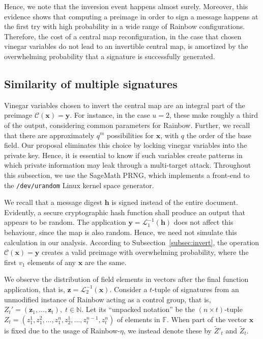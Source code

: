 \documentclass[12pt, a4paper, oneside]{memoir}
\theoremstyle{definition}
\begin{document}
Hence, we note that the inversion event happens almost surely. Moreover, this evidence shows that computing a preimage in order to sign a message happens at the first try with high probability in a wide range of Rainbow configurations. Therefore, the cost of a central map reconfiguration, in the case that chosen vinegar variables do not lead to an invertible central map, is amortized by the overwhelming probability that a signature is successfully generated.

\subsection{Similarity of multiple signatures}\label{subsec:similar}

Vinegar variables chosen to invert the central map are an integral part of the
preimage $\mathcal{C}(\mathbf{x}) = \mathbf{y}$. For instance, in the case $u = 2$, these make roughly a third of the output, considering common parameters for Rainbow. Further, we recall that there are approximately $q^{m}$ possibilities for $\mathbf{x}$, with $q$ the order of the base field. Our proposal eliminates this choice by locking vinegar variables into the private key. Hence, it is essential to know if such variables create patterns in which private information may leak through a multi-target attack. Throughout this subsection, we use the SageMath PRNG, which implements a front-end to the \texttt{/dev/urandom} Linux kernel space generator.

We recall that a message digest $\mathbf{h}$ is signed instead of the entire document. Evidently, a secure cryptographic hash function shall produce an output that appears to be random. The application $\mathbf{y} = \mathcal{L}_{1}^{-1}(\mathbf{h})$ does not affect this behaviour, since the map is also random. Hence, we need not simulate this calculation in our analysis. According to Subsection~\ref{subsec:invert}, the operation $\mathcal{C}(\mathbf{x}) = \mathbf{y}$ creates a valid preimage with overwhelming probability, where the first $v_{1}$ elements of any $\mathbf{x}$ are the same.

We observe the distribution of field elements in vectors after the final function application, that is, $\mathbf{z} = \mathcal{L}_{2}^{-1}(\mathbf{x})$. Consider a $t$-tuple of signatures from an unmodified instance of Rainbow acting as a control group, that is, $Z_{t}' = (\mathbf{z}_{1}, \dots, \mathbf{z}_{t}),\; t \in \mathbb{N}$. Let its ``unpacked notation'' be the $(n \times t)$-tuple $Z_{t} = (z_{1}^{1}, z_{1}^{2}, \dots, z_{1}^{n}, z_{2}^{1}, \dots, z_{t}^{n - 1}, z_{t}^{n})$ of elements in $\mathbb{F}$. When part of the vector $\mathbf{x}$ is fixed due to the usage of Rainbow-$\eta$, we instead denote these by $\widetilde{Z}'_{t}$ and $\widetilde{Z}_{t}$. 
\end{document}
